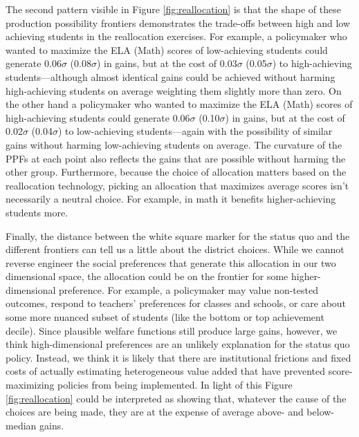 \documentclass[12pt]{article}
\theoremstyle{definition}
\theoremstyle{definition}
\theoremstyle{definition}
\theoremstyle{definition}
\begin{document}
The second pattern visible in Figure \ref{fig:reallocation} is that the shape of these production possibility frontiers demonstrates the trade-offs between high and low achieving students in the reallocation exercises. For example, a policymaker who wanted to maximize the ELA (Math) scores of low-achieving students could generate  0.06$\sigma$ (0.08$\sigma$) in gains, but at the cost of 0.03$\sigma$ (0.05$\sigma$) to high-achieving students---although almost identical gains could be achieved without harming high-achieving students on average weighting them slightly more than zero. On the other hand a policymaker who wanted to maximize the ELA (Math) scores of high-achieving students could generate  0.06$\sigma$ (0.10$\sigma$) in gains, but at the cost of 0.02$\sigma$ (0.04$\sigma$) to low-achieving students---again with the possibility of similar gains without harming low-achieving students on average. The curvature of the PPFs at each point also reflects the gains that are possible without harming the other group. Furthermore, because  the choice of allocation matters based on the reallocation technology, picking an allocation that maximizes average scores isn't necessarily a  neutral choice. For example, in math it benefits higher-achieving students more. 


Finally, the distance between the white square marker for the status quo and the different frontiers can tell us a little about the district choices. While we cannot reverse engineer the social preferences that generate this allocation in our two dimensional space, the allocation could be on the frontier for some higher-dimensional preference. For example, a policymaker may value non-tested outcomes, respond to teachers' preferences for classes and schools, or care about some more nuanced subset of students (like the bottom or top achievement decile). Since plausible welfare functions still produce large gains, however, we think high-dimensional preferences are an unlikely explanation for the status quo policy. Instead, we think it is likely that there are institutional frictions and fixed costs of actually estimating heterogeneous value added that have prevented score-maximizing policies from being implemented. In light of this Figure \ref{fig:reallocation} could be interpreted as showing that, whatever the cause of the choices are being made, they are at the expense of average above- and below-median gains.
 
\end{document}
